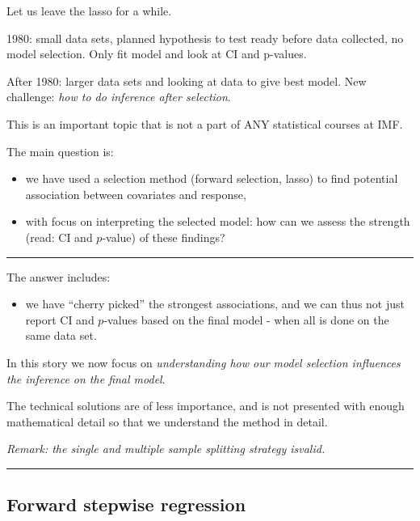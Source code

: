 \documentclass[
  letterpaper,
  DIV=11,
  numbers=noendperiod]{scrartcl}
\providecommand{\tightlist}{%
  \setlength{\itemsep}{0pt}\setlength{\parskip}{0pt}}\usepackage{longtable,booktabs,array}
\begin{document}
Let us leave the lasso for a while.

1980: small data sets, planned hypothesis to test ready before data
collected, no model selection. Only fit model and look at CI and
p-values.

After 1980: larger data sets and looking at data to give best model. New
challenge: \emph{how to do inference after selection}.

This is an important topic that is not a part of ANY statistical courses
at IMF.

The main question is:

\begin{itemize}
\tightlist
\item
  we have used a selection method (forward selection, lasso) to find
  potential association between covariates and response,
\item
  with focus on interpreting the selected model: how can we assess the
  strength (read: CI and \(p\)-value) of these findings?
\end{itemize}

\begin{center}\rule{0.5\linewidth}{0.5pt}\end{center}

The answer includes:

\begin{itemize}
\tightlist
\item
  we have ``cherry picked'' the strongest associations, and we can thus
  not just report CI and \(p\)-values based on the final model - when
  all is done on the same data set.
\end{itemize}

In this story we now focus on \emph{understanding how our model
selection influences the inference on the final model}.

The technical solutions are of less importance, and is not presented
with enough mathematical detail so that we understand the method in
detail.

\emph{Remark: the single and multiple sample splitting strategy
isvalid.}

\begin{center}\rule{0.5\linewidth}{0.5pt}\end{center}

\hypertarget{forward-stepwise-regression}{%
\subsection{Forward stepwise
regression}\label{forward-stepwise-regression}}
\end{document}
